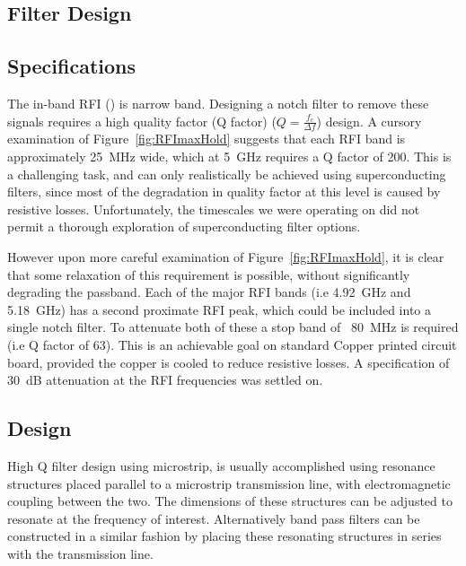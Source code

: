 \clearpage


\subsection{Filter Design}
\label{sec:filterDesign}
\subsection{Specifications}
The in-band RFI () is narrow band. Designing a notch filter to remove these signals requires a high quality factor (Q factor) ($Q=\frac{f_{c}}{\Delta f}$) design. A cursory examination of Figure~\ref{fig:RFImaxHold} suggests that each RFI band is approximately 25~MHz wide, which at 5~GHz requires a Q factor of 200. This is a challenging task, and can only realistically be achieved using superconducting filters, since most of the degradation in quality factor at this level is caused by resistive losses. Unfortunately, the timescales we were operating on did not permit a thorough exploration of superconducting filter options.

However upon more careful examination of Figure~\ref{fig:RFImaxHold}, it is clear that some relaxation of this requirement is possible, without significantly degrading the passband. Each of the major RFI bands (i.e 4.92~GHz and 5.18~GHz) has a second proximate RFI peak, which could be included into a single notch filter. To attenuate both of these a stop band of ~80~MHz is required (i.e Q factor of 63). This is an achievable goal on standard Copper printed circuit board, provided the copper is cooled to reduce resistive losses. A specification of 30~dB attenuation at the RFI frequencies was settled on.

\subsection{Design}

High Q filter design using microstrip, is usually accomplished using resonance structures placed parallel to a microstrip transmission line, with electromagnetic coupling between the two. The dimensions of these structures can be adjusted to resonate at the frequency of interest. Alternatively band pass filters can be constructed in a similar fashion by placing these resonating structures in series with the transmission line.

